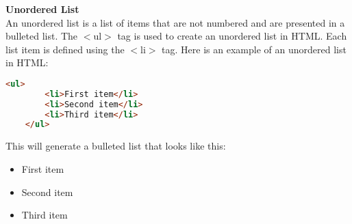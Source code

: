 \documentclass[11pt]{article}
\begin{document}
\textbf{Unordered List}\\
An unordered list is a list of items that are not numbered and are presented in a bulleted list. The $<$ul$>$ tag is used to create an unordered list in HTML. Each list item is defined using the $<$li$>$ tag. Here is an example of an unordered list in HTML:
\begin{lstlisting}[language=html]
    <ul>
        <li>First item</li>
        <li>Second item</li>
        <li>Third item</li>
    </ul>
\end{lstlisting}
This will generate a bulleted list that looks like this:
    \begin{itemize}
        \item First item
        \item  Second item
        \item  Third item
    \end{itemize}
\end{document}
